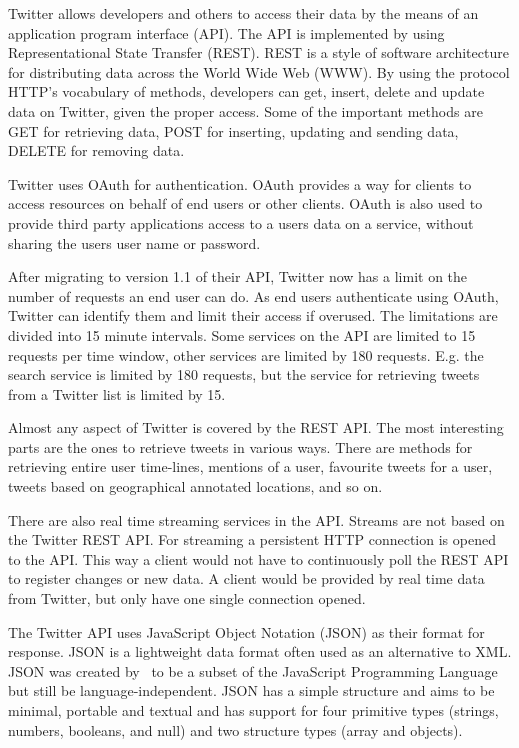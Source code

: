 Twitter allows developers and others to access their data by the means of an application program interface (API). The API is implemented by using Representational State Transfer (REST). REST is a style of software architecture for distributing data across the World Wide Web (WWW). By using the protocol HTTP's vocabulary of methods, developers can get, insert, delete and update data on Twitter, given the proper access. Some of the important methods are GET for retrieving data, POST for inserting, updating and sending data, DELETE for removing data.~\citep{article:rest}

Twitter uses OAuth for authentication. OAuth provides a way for clients to access resources on behalf of end users or other clients. OAuth is also used to provide third party applications access to a users data on a service, without sharing the users user name or password.~\citep{site:oauth}

After migrating to version 1.1 of their API, Twitter now has a limit on the number of requests an end user can do. As end users authenticate using OAuth, Twitter can identify them and limit their access if overused. The limitations are divided into 15 minute intervals. Some services on the API are limited to 15 requests per time window, other services are limited by 180 requests. E.g. the search service is limited by 180 requests, but the service for retrieving tweets from a Twitter list is limited by 15.~\citep{site:twitterlimit}

Almost any aspect of Twitter is covered by the REST API. The most interesting parts are the ones to retrieve tweets in various ways. There are methods for retrieving entire user time-lines, mentions of a user, favourite tweets for a user, tweets based on geographical annotated locations, and so on.~\citep{site:twitterapi}

There are also real time streaming services in the API. Streams are not based on the Twitter REST API. For streaming a persistent HTTP connection is opened to the API. This way a client would not have to continuously poll the REST API to register changes or new data. A client would be provided by real time data from Twitter, but only have one single connection opened.~\citep{site:twitterstream}

The Twitter API uses JavaScript Object Notation (JSON) as their format for response. JSON is a lightweight data format often used as an alternative to XML. JSON was created by~\citeauthor{site:json} to be a subset of the JavaScript Programming Language but still be language-independent. JSON has a simple structure and aims to be minimal, portable and textual and has support for four primitive types (strings, numbers, booleans, and null) and two structure types (array and objects).~\citep{site:json}


